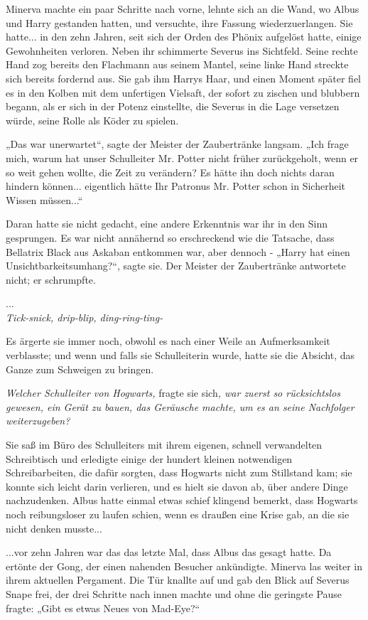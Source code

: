 {Minerva machte ein paar Schritte nach vorne, lehnte sich an die Wand, wo Albus und Harry gestanden hatten, und versuchte, ihre Fassung wiederzuerlangen. Sie hatte... in den zehn Jahren, seit sich der Orden des Phönix aufgelöst hatte, einige Gewohnheiten verloren. Neben ihr schimmerte Severus ins Sichtfeld. Seine rechte Hand zog bereits den Flachmann aus seinem Mantel, seine linke Hand streckte sich bereits fordernd aus. Sie gab ihm Harrys Haar, und einen Moment später fiel es in den Kolben mit dem unfertigen Vielsaft, der sofort zu zischen und blubbern begann, als er sich in der Potenz einstellte, die Severus in die Lage versetzen würde, seine Rolle als Köder zu spielen.

„Das war unerwartet“, sagte der Meister der Zaubertränke langsam. „Ich frage mich, warum hat unser Schulleiter Mr. Potter nicht früher zurückgeholt, wenn er so weit gehen wollte, die Zeit zu verändern? Es hätte ihn doch nichts daran hindern können... eigentlich hätte Ihr Patronus Mr. Potter schon in Sicherheit Wissen müssen...“

Daran hatte sie nicht gedacht, eine andere Erkenntnis war ihr in den Sinn gesprungen. Es war nicht annähernd so erschreckend wie die Tatsache, dass Bellatrix Black aus Askaban entkommen war, aber dennoch - „Harry hat einen Unsichtbarkeitsumhang?“, sagte sie. Der Meister der Zaubertränke antwortete nicht; er schrumpfte.

...\\ \emph{Tick-snick, drip-blip, ding-ring-ting-}

Es ärgerte sie immer noch, obwohl es nach einer Weile an Aufmerksamkeit verblasste; und wenn und falls sie Schulleiterin wurde, hatte sie die Absicht, das Ganze zum Schweigen zu bringen.

\emph{Welcher Schulleiter von Hogwarts,} fragte sie sich\emph{, war zuerst so rücksichtslos gewesen, ein Gerät zu bauen, das Geräusche machte, um es an seine Nachfolger weiterzugeben?}

Sie saß im Büro des Schulleiters mit ihrem eigenen, schnell verwandelten Schreibtisch und erledigte einige der hundert kleinen notwendigen Schreibarbeiten, die dafür sorgten, dass Hogwarts nicht zum Stillstand kam; sie konnte sich leicht darin verlieren, und es hielt sie davon ab, über andere Dinge nachzudenken. Albus hatte einmal etwas schief klingend bemerkt, dass Hogwarts noch reibungsloser zu laufen schien, wenn es draußen eine Krise gab, an die sie nicht denken musste...

...vor zehn Jahren war das das letzte Mal, dass Albus das gesagt hatte. Da ertönte der Gong, der einen nahenden Besucher ankündigte. Minerva las weiter in ihrem aktuellen Pergament. Die Tür knallte auf und gab den Blick auf Severus Snape frei, der drei Schritte nach innen machte und ohne die geringste Pause fragte: „Gibt es etwas Neues von Mad-Eye?“

}
